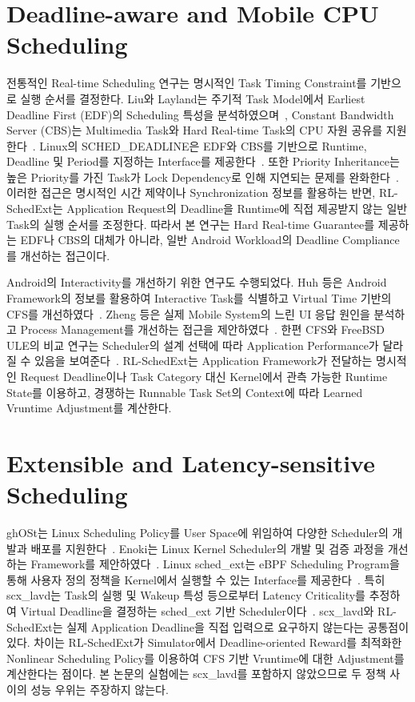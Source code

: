 \section{Deadline-aware and Mobile CPU Scheduling}
\label{sec:related-deadline-aware-and-mobile-cpu-scheduling}

전통적인 Real-time Scheduling 연구는 명시적인 Task Timing Constraint를 기반으로 실행 순서를 결정한다. Liu와 Layland는 주기적 Task Model에서 Earliest Deadline First (EDF)의 Scheduling 특성을 분석하였으며~\cite{liu1973}, Constant Bandwidth Server (CBS)는 Multimedia Task와 Hard Real-time Task의 CPU 자원 공유를 지원한다~\cite{abeni1998}. Linux의 SCHED\_DEADLINE은 EDF와 CBS를 기반으로 Runtime, Deadline 및 Period를 지정하는 Interface를 제공한다~\cite{scheddeadline}. 또한 Priority Inheritance는 높은 Priority를 가진 Task가 Lock Dependency로 인해 지연되는 문제를 완화한다~\cite{sha1990}. 이러한 접근은 명시적인 시간 제약이나 Synchronization 정보를 활용하는 반면, RL-SchedExt는 Application Request의 Deadline을 Runtime에 직접 제공받지 않는 일반 Task의 실행 순서를 조정한다. 따라서 본 연구는 Hard Real-time Guarantee를 제공하는 EDF나 CBS의 대체가 아니라, 일반 Android Workload의 Deadline Compliance를 개선하는 접근이다.

Android의 Interactivity를 개선하기 위한 연구도 수행되었다. Huh 등은 Android Framework의 정보를 활용하여 Interactive Task를 식별하고 Virtual Time 기반의 CFS를 개선하였다~\cite{huh2015}. Zheng 등은 실제 Mobile System의 느린 UI 응답 원인을 분석하고 Process Management를 개선하는 접근을 제안하였다~\cite{zheng2024}. 한편 CFS와 FreeBSD ULE의 비교 연구는 Scheduler의 설계 선택에 따라 Application Performance가 달라질 수 있음을 보여준다~\cite{battle}. RL-SchedExt는 Application Framework가 전달하는 명시적인 Request Deadline이나 Task Category 대신 Kernel에서 관측 가능한 Runtime State를 이용하고, 경쟁하는 Runnable Task Set의 Context에 따라 Learned Vruntime Adjustment를 계산한다.

\section{Extensible and Latency-sensitive Scheduling}
\label{sec:related-extensible-and-latency-sensitive-scheduling}

ghOSt는 Linux Scheduling Policy를 User Space에 위임하여 다양한 Scheduler의 개발과 배포를 지원한다~\cite{ghost}. Enoki는 Linux Kernel Scheduler의 개발 및 검증 과정을 개선하는 Framework를 제안하였다~\cite{enoki}. Linux sched\_ext는 eBPF Scheduling Program을 통해 사용자 정의 정책을 Kernel에서 실행할 수 있는 Interface를 제공한다~\cite{schedext}. 특히 scx\_lavd는 Task의 실행 및 Wakeup 특성 등으로부터 Latency Criticality를 추정하여 Virtual Deadline을 결정하는 sched\_ext 기반 Scheduler이다~\cite{lavd}. scx\_lavd와 RL-SchedExt는 실제 Application Deadline을 직접 입력으로 요구하지 않는다는 공통점이 있다. 차이는 RL-SchedExt가 Simulator에서 Deadline-oriented Reward를 최적화한 Nonlinear Scheduling Policy를 이용하여 CFS 기반 Vruntime에 대한 Adjustment를 계산한다는 점이다. 본 논문의 실험에는 scx\_lavd를 포함하지 않았으므로 두 정책 사이의 성능 우위는 주장하지 않는다.

